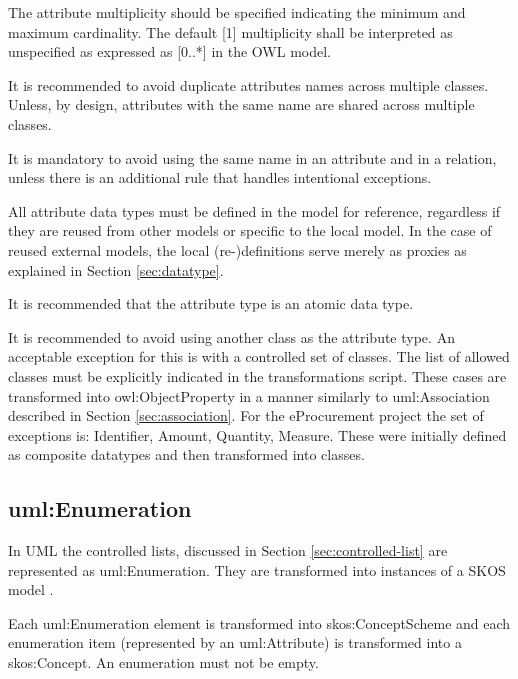 	The attribute multiplicity should be specified indicating the minimum and maximum cardinality. The default [1] multiplicity shall be interpreted as unspecified as expressed as [0..*] in the OWL model.

	It is recommended to avoid duplicate attributes names across multiple classes. Unless, by design, attributes with the same name are shared across multiple classes. 
	
	It is mandatory to avoid using the same name in an attribute and in a relation, unless there is an additional rule that handles intentional exceptions.  
	
	All attribute data types must be defined in the model for reference, regardless if they are reused from other models or specific to the local model. In the case of reused external models, the local (re-)definitions serve merely as proxies as explained in Section \ref{sec:datatype}.
	
	It is recommended that the attribute type is an atomic data type. 


	It is recommended to avoid using another class as the attribute type. An acceptable exception for this is with a controlled set of classes. The list of allowed classes must be explicitly indicated in the transformations script. These cases are transformed into owl:ObjectProperty in a manner similarly to uml:Association described in Section \ref{sec:association}. For the eProcurement project the set of exceptions is: Identifier, Amount, Quantity, Measure. These were initially defined as composite datatypes and then transformed into classes. 
	
	\subsection{uml:Enumeration}
	\label{sec:enumeration}

	In UML the controlled lists, discussed in Section \ref{sec:controlled-list} are represented as uml:Enumeration. They are transformed into instances of a SKOS model \cite{skos-spec}. 
	
	Each uml:Enumeration element is transformed into skos:ConceptScheme and each enumeration item (represented by an uml:Attribute) is transformed into a skos:Concept. An enumeration must not be empty.
	
